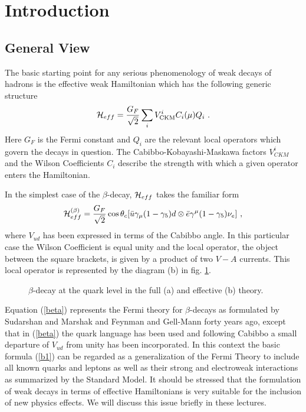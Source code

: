 \documentclass[12pt,rotate]{article}
\newcommand{\be}{\begin{equation}}
\newcommand{\ee}{\end{equation}}
\begin{document}

\setcounter{page}{1}

\section{Introduction}
\subsection{General View}
The basic starting point for any serious phenomenology of weak decays of
hadrons is the effective weak Hamiltonian which has the following generic
structure
\be\label{b1}
{\cal H}_{eff}=\frac{G_F}{\sqrt{2}}\sum_i V^i_{\rm CKM}C_i(\mu)Q_i~.
\ee
Here $G_F$ is the Fermi constant and $Q_i$ are the relevant local
operators which govern the decays in question. The Cabibbo-Kobayashi-Maskawa
factors $V^i_{CKM}$ \cite{CAB,KM} 
and the Wilson Coefficients $C_i$ \cite{OPE,ZIMM} describe the 
strength with which a given operator enters the Hamiltonian.

In the simplest case of the $\beta$-decay, ${\cal H}_{eff}$ takes 
the familiar form
\be\label{beta}
{\cal H}^{(\beta)}_{eff}=\frac{G_F}{\sqrt{2}}
\cos\theta_c[\bar u\gamma_\mu(1-\gamma_5)d \otimes
\bar e \gamma^\mu (1-\gamma_5)\nu_e]~,
\ee
where $V_{ud}$ has been expressed in terms of the Cabibbo angle. In this
particular case the Wilson Coefficient is equal unity and the local
operator, the object between the square brackets, is given by a product 
of two $V-A$ currents. This local operator is represented by the
diagram (b) in fig. \ref{L:1}.
\begin{figure}[hbt]
\vspace{0.10in}
\centerline{
\epsfysize=1.9in
}%
\vspace{0.08in}
\caption[]{
$\beta$-decay at the quark level in the full (a) and effective (b)
theory.
\label{L:1}}
\end{figure}
Equation (\ref{beta}) represents the Fermi theory for $\beta$-decays 
as formulated by Sudarshan and
Marshak \cite{SUMA} and Feynman and Gell-Mann \cite{GF} forty years ago, 
except that in (\ref{beta})
the quark language has been used and following Cabibbo a small departure of
$V_{ud}$ from unity has been incorporated. In this context the basic 
formula (\ref{b1})
can be regarded as a generalization of the Fermi Theory to include all known
quarks and leptons as well as their strong and electroweak interactions as
summarized by the Standard Model. It should be stressed that the formulation
of weak decays in terms of effective Hamiltonians is very suitable for the
inclusion of new physics effects. We will discuss this issue briefly in these
lectures.
\end{document}
